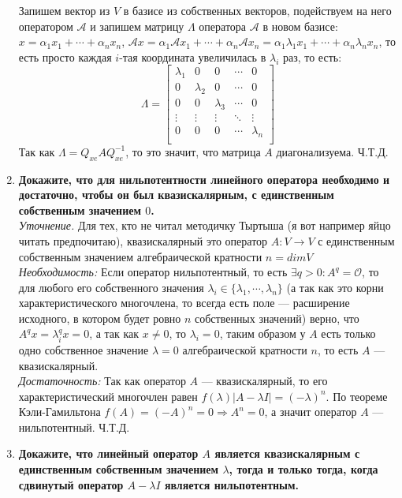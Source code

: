 \documentclass[12pt]{article} %
\begin{document}
\begin{enumerate}
    Запишем вектор из $V$ в базисе из собственных векторов, подействуем на него оператором $\mathcal{A}$ и запишем матрицу $\Lambda$ оператора $\mathcal{A}$ в новом базисе: $x = \alpha_1 x_1 + \cdots + \alpha_n x_n$, $\mathcal{A} x = \alpha_1 \mathcal{A}  x_1 + \cdots + \alpha_n \mathcal{A} x_n = \alpha_1 \lambda_1 x_1 + \cdots + \alpha_n \lambda_n x_n$, то есть просто каждая $i$-тая координата увеличилась в $\lambda_i$ раз, то есть:
    \[
    \Lambda = 
    \begin{bmatrix}
        \lambda_1 & 0 & 0 & \cdots & 0\\
        0 & \lambda_2 & 0 & \cdots & 0\\
        0 & 0 & \lambda_3 & \cdots & 0\\
        \vdots & \vdots & \vdots & \ddots & \vdots\\
        0 & 0 & 0 & \cdots & \lambda_n\\       
    \end{bmatrix}
    \]
    Так как $\Lambda = Q_{xe}AQ_{xe}^{-1}$, то это значит, что матрица $A$ диагонализуема. Ч.Т.Д.
    
    \item \textbf{Докажите, что для нильпотентности линейного оператора необходимо и достаточно, чтобы он был квазискалярным, с единственным собственным значением $0$.}\\

    \textit{Уточнение. }Для тех, кто не читал методичку Тыртыша (я вот например яйцо читать предпочитаю), квазискалярный это оператор $A: V \rightarrow V$ с единственным собственным значением алгебраической кратности $n = dimV$\\

    \textit{Необходимость:} Если оператор нильпотентный, то есть $\exists  q > 0: A^q = \mathcal{O}$, то для любого его собственного значения $\lambda_i \in \{\lambda_1, \cdots, \lambda_n\}$ (а так как это корни характеристического многочлена, то всегда есть поле --- расширение исходного, в котором будет ровно $n$ собственных значений) верно, что $A^qx = \lambda_i^qx = 0$, а так как $x \neq 0$, то $\lambda_i = 0$, таким образом у $A$ есть только одно собственное значение $\lambda = 0$ алгебраической кратности $n$, то есть $A$ --- квазискалярный.\\

    \textit{Достаточность:} Так как оператор $A$ --- квазискалярный, то его характеристический многочлен равен $f(\lambda)|A - \lambda I| = (-\lambda)^n$. По теореме Кэли-Гамильтона $f(A) = (-A)^n = 0 \Rightarrow A^n = 0$, а значит оператор $A$ --- нильпотентный. Ч.Т.Д.
    \item \textbf{Докажите, что линейный оператор  $A$ является квазискалярным с единственным собственным значением $\lambda$, тогда и только тогда, когда сдвинутый оператор $A - \lambda I$ является нильпотентным.}\\


\end{enumerate}
\end{document}
